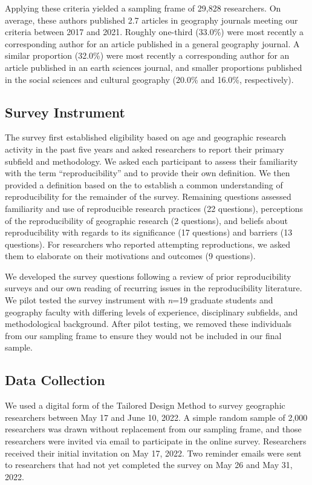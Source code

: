 \documentclass[]{interact}
\newcommand{\citep}{\parencite}
\theoremstyle{plain}%
\theoremstyle{definition}
\theoremstyle{remark}
\begin{document}
Applying these criteria yielded a sampling frame of 29,828 researchers. 
On average, these authors published 2.7 articles in geography journals meeting our criteria between 2017 and 2021. 
Roughly one-third (33.0\%) were most recently a corresponding author for an article published in a general geography journal. 
A similar proportion (32.0\%) were most recently a corresponding author for an article published in an earth sciences journal, and smaller proportions published in the social sciences and cultural geography (20.0\% and 16.0\%, respectively).

\subsection*{Survey Instrument}
The survey first established eligibility based on age and geographic research activity in the past five years and asked researchers to report their primary subfield and methodology.
We asked each participant to assess their familiarity with the term ``reproducibility'' and to provide their own definition. 
We then provided a definition based on the \textcite{NASEM2019} to establish a common understanding of reproducibility for the remainder of the survey.
Remaining questions assessed familiarity and use of reproducible research practices (22 questions), perceptions of the reproducibility of geographic research (2 questions), and beliefs about reproducibility with regards to its significance (17 questions) and barriers (13 questions).
For researchers who reported attempting reproductions, we asked them to elaborate on their motivations and outcomes (9 questions).

We developed the survey questions following a review of prior reproducibility surveys \citep[e.g.,][]{fanelli2009many,baker20161, konkol2019} and our own reading of recurring issues in the reproducibility literature. 
We pilot tested the survey instrument with \textit{n}=19 graduate students and geography faculty with differing levels of experience, disciplinary subfields, and methodological background. 
After pilot testing, we removed these individuals from our sampling frame to ensure they would not be included in our final sample.

\subsection*{Data Collection}
We used a digital form of the Tailored Design Method \citep{dillman2014internet} to survey geographic researchers between May 17 and June 10, 2022.
A simple random sample of 2,000 researchers was drawn without replacement from our sampling frame, and those researchers were invited via email to participate in the online survey. 
Researchers received their initial invitation on May 17, 2022. 
Two reminder emails were sent to researchers that had not yet completed the survey on May 26 and May 31, 2022.
\end{document}

